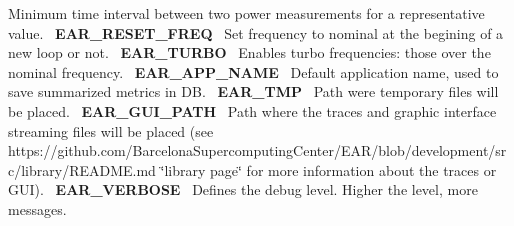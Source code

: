  Minimum time interval between two power measurements for a representative value.~\newline
 {\bfseries E\+A\+R\+\_\+\+R\+E\+S\+E\+T\+\_\+\+F\+R\+EQ}~\newline
 Set frequency to nominal at the begining of a new loop or not.~\newline
 {\bfseries E\+A\+R\+\_\+\+T\+U\+R\+BO}~\newline
 Enables turbo frequencies\+: those over the nominal frequency.~\newline
 {\bfseries E\+A\+R\+\_\+\+A\+P\+P\+\_\+\+N\+A\+ME}~\newline
 Default application name, used to save summarized metrics in DB.~\newline
 {\bfseries E\+A\+R\+\_\+\+T\+MP}~\newline
 Path were temporary files will be placed.~\newline
 {\bfseries E\+A\+R\+\_\+\+G\+U\+I\+\_\+\+P\+A\+TH}~\newline
 Path where the traces and graphic interface streaming files will be placed (see https\+://github.com/\+Barcelona\+Supercomputing\+Center/\+E\+A\+R/blob/development/src/library/\+R\+E\+A\+D\+M\+E.\+md \char`\"{}library page\char`\"{} for more information about the traces or G\+UI).~\newline
 {\bfseries E\+A\+R\+\_\+\+V\+E\+R\+B\+O\+SE}~\newline
 Defines the debug level. Higher the level, more messages.~\newline
 